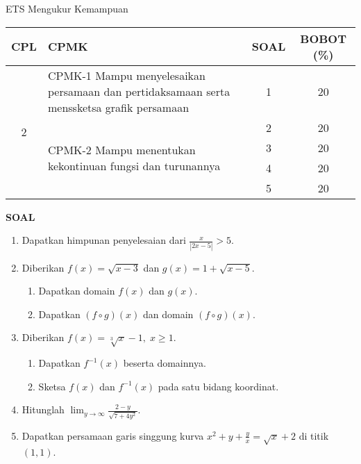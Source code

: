 \documentclass[11pt,openany,a4paper]{article}
\begin{document}
\begin{table}[h]
    \centering
    ETS Mengukur Kemampuan
    \begin{tabular}{|c|m{11cm}|c|c|}
        \hline
        CPL & CPMK                                                                                      & SOAL & BOBOT (\%) \\ \hline
        \multirow{5}{*}{2}
            & CPMK-1 Mampu menyelesaikan persamaan dan pertidaksamaan serta menssketsa grafik persamaan & 1    & 20         \\ \cline{2-4}
            & \multirow{4}{*}{CPMK-2 Mampu menentukan kekontinuan fungsi dan turunannya}                & 2    & 20         \\\cline{3-4}
            &                                                                                           & 3    & 20         \\ \cline{3-4}
            &                                                                                           & 4    & 20         \\ \cline{3-4}
            &                                                                                           & 5    & 20         \\ \hline
    \end{tabular}
\end{table}
{\centering\textbf{SOAL}}
\begin{enumerate}
    \item Dapatkan himpunan penyelesaian dari
          $\displaystyle
              \frac{x}{|2x - 5|} > 5.
          $

    \item Diberikan $f(x) = \sqrt{x - 3}$ dan $g(x) = 1 + \sqrt{x - 5}$.
          \begin{enumerate}
              \item Dapatkan domain $f(x)$ dan $g(x)$.
              \item Dapatkan $(f \circ g)(x)$ dan domain $(f \circ g)(x)$.
          \end{enumerate}

    \item Diberikan $f(x) = \sqrt[3]{x} - 1, \; x \geq 1$.
          \begin{enumerate}
              \item Dapatkan $f^{-1}(x)$ beserta domainnya.
              \item Sketsa $f(x)$ dan $f^{-1}(x)$ pada satu bidang koordinat.
          \end{enumerate}

    \item Hitunglah
          $\displaystyle
              \lim_{y \to \infty} \frac{2 - y}{\sqrt{7 + 4y^2}}.
          $

    \item Dapatkan persamaan garis singgung kurva
          $
              x^2 + y + \frac{y}{x} = \sqrt{x} + 2
          $
          di titik $(1,1)$.
\end{enumerate}
\end{document}
